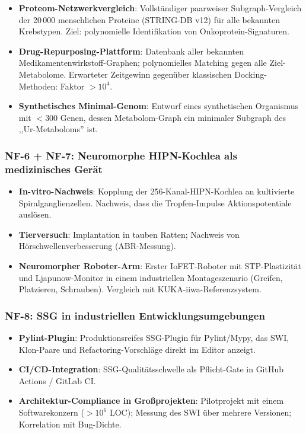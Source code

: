 ﻿\documentclass[a4paper,12pt]{scrreprt}
\theoremstyle{definition}
\begin{document}
\begin{itemize}
  \item \textbf{Proteom-Netzwerkvergleich}: Vollständiger paarweiser
    Subgraph-Vergleich der 20\,000 menschlichen Proteine (STRING-DB v12)
    für alle bekannten Krebstypen. Ziel: polynomielle Identifikation
    von Onkoprotein-Signaturen.
  \item \textbf{Drug-Repurposing-Plattform}: Datenbank aller bekannten
    Medikamentenwirkstoff-Graphen; polynomielles Matching gegen alle
    Ziel-Metabolome. Erwarteter Zeitgewinn gegenüber klassischen
    Docking-Methoden: Faktor $> 10^4$.
  \item \textbf{Synthetisches Minimal-Genom}: Entwurf eines synthetischen
    Organismus mit $< 300$ Genen, dessen Metabolom-Graph ein minimaler
    Subgraph des ,,Ur-Metaboloms'' ist.
\end{itemize}

\subsubsection{NF-6 + NF-7: Neuromorphe HIPN-Kochlea als medizinisches Gerät}

\begin{itemize}
  \item \textbf{In-vitro-Nachweis}: Kopplung der 256-Kanal-HIPN-Kochlea
    an kultivierte Spiralganglienzellen. Nachweis, dass die
    Tropfen-Impulse Aktionspotentiale auslösen.
  \item \textbf{Tierversuch}: Implantation in tauben Ratten; Nachweis
    von Hörschwellenverbesserung (ABR-Messung).
  \item \textbf{Neuromorpher Roboter-Arm}: Erster IoFET-Roboter mit
    STP-Plastizität und Ljapunow-Monitor in einem industriellen
    Montageszenario (Greifen, Platzieren, Schrauben). Vergleich
    mit KUKA-iiwa-Referenzsystem.
\end{itemize}

\subsubsection{NF-8: SSG in industriellen Entwicklungsumgebungen}

\begin{itemize}
  \item \textbf{Pylint-Plugin}: Produktionsreifes SSG-Plugin für
    Pylint/Mypy, das SWI, Klon-Paare und Refactoring-Vorschläge
    direkt im Editor anzeigt.
  \item \textbf{CI/CD-Integration}: SSG-Qualitätsschwelle als
    Pflicht-Gate in GitHub Actions / GitLab CI.
  \item \textbf{Architektur-Compliance in Großprojekten}: Pilotprojekt
    mit einem Softwarekonzern ($> 10^6$ LOC); Messung des
    SWI über mehrere Versionen; Korrelation mit Bug-Dichte.
\end{itemize}
\end{document}
